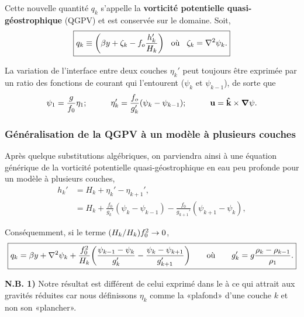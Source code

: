 \documentclass[10pt]{article}
\numberwithin{equation}{section}
\newcommand{\kvf}{\vb{\hat{k}}}
\begin{document}
Cette nouvelle quantité \(q_k\) s'appelle la \textbf{vorticité potentielle quasi-géostrophique} (QGPV) et est conservée sur le domaine.
Soit,
\begin{equation}
\label{eq:org8ca8bd7}
\boxed{q_k \equiv \qty( \beta  y + \zeta_k - f_o \frac{h_k'}{H_k})
\hspace{0.3cm} \text{où} \hspace{0.3cm}
\zeta_k = \laplacian \psi_k.}
\end{equation}

La variation de l'interface entre deux couches \(\eta_k'\) peut toujours être exprimée par un ratio des fonctions de courant qui l'entourent (\(\psi_{k}\) et \(\psi_{k-1}\)), de sorte que 
\begin{equation}
\psi_1 = \frac{g}{f_0} \eta_1; 
\hspace{1cm} \eta_k' = \frac{f_o}{g_k'} \qty(\psi_k - \psi_{k-1});
\hspace{1cm} \vb{u} = \kvf \times \gradient\psi.
\end{equation}
\subsubsection{Généralisation de la QGPV à un modèle à plusieurs couches}
\label{sec:org1f0f766}

Après quelque substitutions algébriques, on parviendra ainsi à une équation générique de la vorticité potentielle quasi-géostrophique en eau peu profonde pour un modèle à plusieurs couches,
\begin{align}
h_k' &= H_k + \eta_k' - \eta_{k+1}',\\
&= H_k + \frac{f_0}{g_k'} (\psi_k - \psi_{k-1}) - \frac{f_0}{g_{k+1}'} (\psi_{k+1} - \psi_k),
\end{align}

Conséquemment, si le terme \(\qty(H_k/H_k)f_0^2 \rightarrow 0\), 
\begin{equation}
\boxed{q_k  = \beta y + \laplacian \psi_k + \frac{f_0^2}{H_k} \qty(\frac{\psi_{k-1}-\psi_k}{g_k'} -  \frac{\psi_k - \psi_{k+1}}{g_{k+1}'})
\hspace{0.7cm} \text{où} \hspace{0.7cm}
g_k' = g \frac{\rho_k - \rho_{k-1}}{\rho_1}.}
\end{equation}

\textbf{N.B. 1)} Notre résultat est différent de celui exprimé dans le \autocite[, p.185]{vallis_2006} à ce qui attrait aux gravités réduites car nous définissons \(\eta_k\) comme la «plafond» d'une couche \(k\) et non son «plancher».\\
\end{document}

